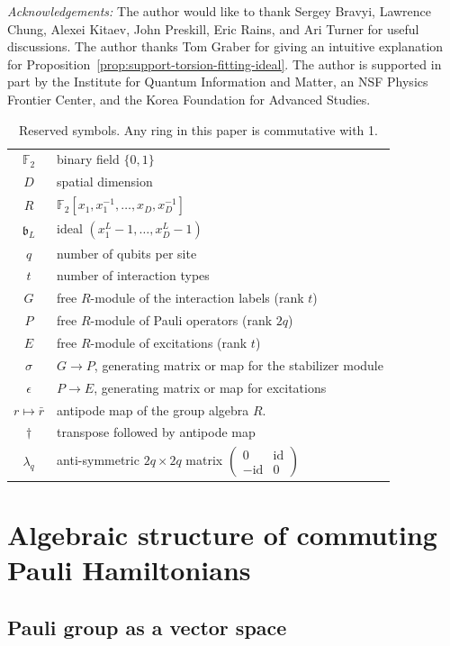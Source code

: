 \documentclass[letterpaper,12pt]{amsart}
\theoremstyle{definition} \newtheorem{defn}{Definition}
\theoremstyle{definition} \newtheorem{rem}{Remark}
\theoremstyle{definition} \newtheorem{example}{Example}
\newcommand{\FF}{\mathbb{F}}
\newcommand{\bb}{\mathfrak{b}}
\newcommand{\id}{\mathrm{id}}
\begin{document}
\emph{Acknowledgements:}
The author would like to thank
Sergey Bravyi, 
Lawrence Chung, 
Alexei Kitaev, 
John Preskill, 
Eric Rains, 
and Ari Turner
for useful discussions.
The author thanks Tom Graber for giving an intuitive explanation
for Proposition~\ref{prop:support-torsion-fitting-ideal}.
The author is supported in part by the
Institute for Quantum Information and Matter, an NSF Physics Frontier Center,
and the Korea Foundation for Advanced Studies.


\begin{table}[t]
\begin{tabular}{c|l}
\hline
$\FF_2$ & binary field $\{0,1\}$\\
$D$ & spatial dimension \\
$R$ & $\FF_2[x_1, x_1^{-1}, \ldots, x_D, x_D^{-1}]$ \\
$\bb_L$ & ideal $(x_1^L-1,\ldots,x_D^L -1)$\\
$q$ & number of qubits per site \\
$t$ & number of interaction types \\
$G$ & free $R$-module of the interaction labels (rank $t$) \\
$P$ & free $R$-module of Pauli operators (rank $2q$)\\
$E$ & free $R$-module of excitations (rank $t$)\\
$\sigma$ & $G \to P$, generating matrix or map for the stabilizer module \\
$\epsilon$ & $P \to E$, generating matrix or map for excitations \\
$r \mapsto \bar r$ & antipode map of the group algebra $R$.\\
$\dagger$ & transpose followed by antipode map \\
$\lambda_q$ & anti-symmetric $2q \times 2q$ matrix $\begin{pmatrix} 0 & \id \\ -\id & 0 \end{pmatrix}$ \\
\hline
\end{tabular}
\caption{Reserved symbols. Any ring in this paper is commutative with 1.}
\end{table}

\section{Algebraic structure of commuting Pauli Hamiltonians}

\subsection{Pauli group as a vector space}
\end{document}
